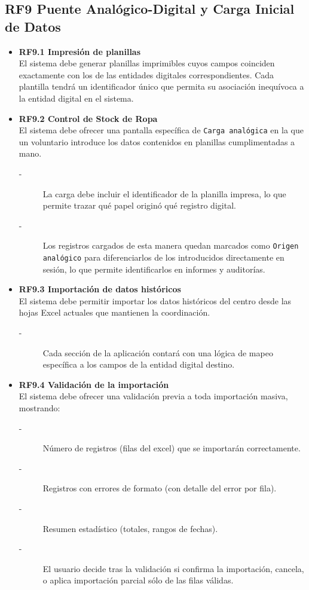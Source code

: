 \subsection{RF9 Puente Analógico-Digital y Carga Inicial de Datos}
\begin{itemize}
    \item \textbf{RF9.1 Impresión de planillas} \\
    El sistema debe generar planillas imprimibles cuyos campos coinciden
    exactamente con los de las entidades digitales correspondientes. Cada plantilla tendrá un 
    identificador único que permita su asociación inequívoca a la entidad digital en el sistema.


    \item \textbf{RF9.2 Control de Stock de Ropa} \\
    El sistema debe ofrecer una pantalla específica de \texttt{Carga analógica} en
    la que un voluntario introduce los datos contenidos en
    planillas cumplimentadas a mano.
    \begin{description}
        \item[-] La carga debe incluir el identificador de la planilla impresa, lo que
        permite trazar qué papel originó qué registro digital.
        \item[-] Los registros cargados de esta manera quedan marcados como \texttt{Origen analógico}
        para diferenciarlos de los introducidos directamente en sesión, lo
        que permite identificarlos en informes y auditorías.
    \end{description}


    \item \textbf{RF9.3 Importación de datos históricos} \\
    El sistema debe permitir importar los datos históricos del centro desde las hojas Excel actuales que mantienen la coordinación.
    \begin{description}
        \item[-] Cada sección de la aplicación contará con una lógica de mapeo específica a los campos de la entidad digital destino. 
    \end{description}


    \item \textbf{RF9.4 Validación de la importación} \\
    El sistema debe ofrecer una validación previa a toda importación
    masiva, mostrando:
    \begin{description}
        \item[-] Número de registros (filas del excel) que se importarán correctamente. 
        \item[-] Registros con errores de formato (con detalle del error por fila). 
        \item[-] Resumen estadístico (totales, rangos de fechas). 
        \item[-] El usuario decide tras la validación si confirma la importación,
        cancela, o aplica importación parcial sólo de las filas válidas. 
    \end{description}



\end{itemize}
